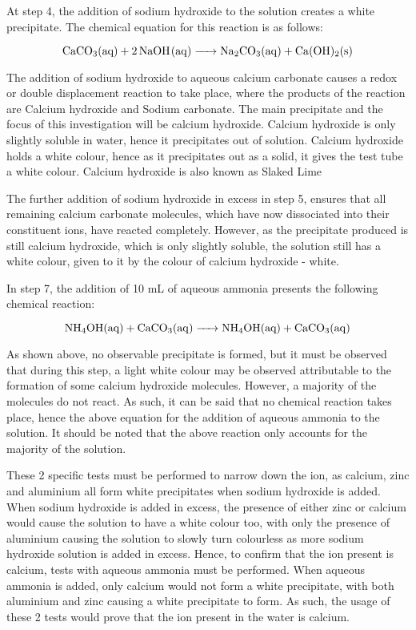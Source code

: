 \documentclass[11pt, a4]{article}
\begin{document}
					At step 4, the addition of sodium hydroxide to the solution creates a white precipitate. The chemical equation for this reaction is as follows:
	
					\begin{equation}
						\ce{CaCO_3{(aq)} + 2NaOH(aq) -> Na_2CO_3(aq) + Ca(OH)_2(s)}
					\end{equation}
					
					The addition of sodium hydroxide to aqueous calcium carbonate causes a redox or double displacement reaction to take place, where the products of the reaction are Calcium hydroxide and Sodium carbonate. The main precipitate and the focus of this investigation will be calcium hydroxide. Calcium hydroxide is only slightly soluble in water, hence it precipitates out of solution. Calcium hydroxide holds a white colour, hence as it precipitates out as a solid, it gives the test tube a white colour. Calcium hydroxide is also known as Slaked Lime
	
					The further addition of sodium hydroxide in excess in step 5, ensures that all remaining calcium carbonate molecules, which have now dissociated into their constituent ions, have reacted completely. However, as the precipitate produced is still calcium hydroxide, which is only slightly soluble, the solution still has a white colour, given to it by the colour of calcium hydroxide - white.
	
					In step 7, the addition of 10 mL of aqueous ammonia presents the following chemical reaction:
	
					\begin{equation}
						\ce{NH_4OH{(aq)} + CaCO_3(aq) -> NH_4OH{(aq)} + CaCO_3(aq)}
					\end{equation}
	
					As shown above, no observable precipitate is formed, but it must be observed that during this step, a light white colour may be observed attributable to the formation of some calcium hydroxide molecules. However, a majority of the molecules do not react. As such, it can be said that no chemical reaction takes place, hence the above equation for the addition of aqueous ammonia to the solution. It should be noted that the above reaction only accounts for the majority of the solution.

					These 2 specific tests must be performed to narrow down the ion, as calcium, zinc and aluminium all form white precipitates when sodium hydroxide is added. When sodium hydroxide is added in excess, the presence of either zinc or calcium would cause the solution to have a white colour too, with only the presence of aluminium causing the solution to slowly turn colourless as more sodium hydroxide solution is added in excess. Hence, to confirm that the ion present is calcium, tests with aqueous ammonia must be performed. When aqueous ammonia is added, only calcium would not form a white precipitate, with both aluminium and zinc causing a white precipitate to form. As such, the usage of these 2 tests would prove that the ion present in the water is calcium.
\end{document}
